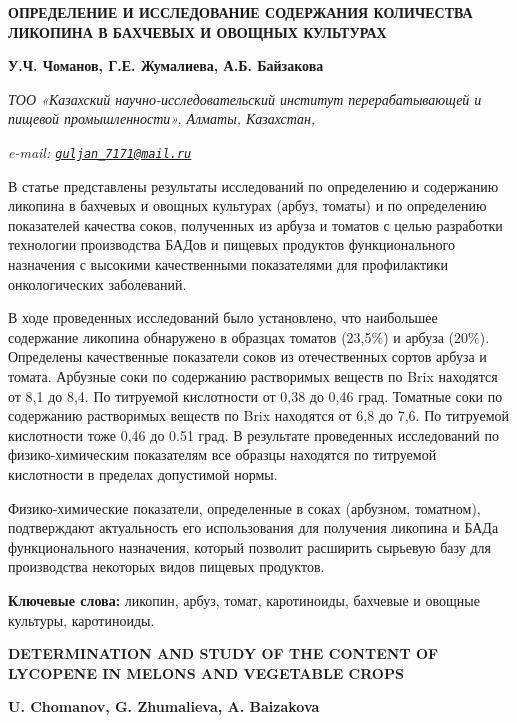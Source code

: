 \begin{articleheader}
{\bfseries ОПРЕДЕЛЕНИЕ И ИССЛЕДОВАНИЕ СОДЕРЖАНИЯ КОЛИЧЕСТВА ЛИКОПИНА В БАХЧЕВЫХ И ОВОЩНЫХ КУЛЬТУРАХ}

{\bfseries
У.Ч. Чоманов,
Г.Е. Жумалиева\textsuperscript{\envelope },
А.Б. Байзакова}
\end{articleheader}

\begin{affiliation}
\emph{ТОО «Казахский научно-исследовательский институт перерабатывающей и пищевой промышленности», Алматы, Казахстан,}

\emph{e-mail: \href{mailto:guljan_7171@mail.ru}{\nolinkurl{guljan\_7171@mail.ru}}}
\end{affiliation}

В статье представлены результаты исследований по определению и
содержанию ликопина в бахчевых и овощных культурах (арбуз, томаты) и по
определению показателей качества соков, полученных из арбуза и томатов с
целью разработки технологии производства БАДов и пищевых продуктов
функционального назначения с высокими качественными показателями для
профилактики онкологических заболеваний.

В ходе проведенных исследований было установлено, что наибольшее
содержание ликопина обнаружено в образцах томатов (23,5\%) и арбуза
(20\%). Определены качественные показатели соков из отечественных сортов
арбуза и томата. Арбузные соки по содержанию растворимых веществ по Brix
находятся от 8,1 до 8,4. По титруемой кислотности от 0,38 до 0,46 град.
Томатные соки по содержанию растворимых веществ по Brix находятся от 6,8
до 7,6. По титруемой кислотности тоже 0,46 до 0.51 град. В результате
проведенных исследований по физико-химическим показателям все образцы
находятся по титруемой кислотности в пределах допустимой нормы.

Физико-химические показатели, определенные в соках (арбузном, томатном),
подтверждают актуальность его использования для получения ликопина и
БАДа функционального назначения, который позволит расширить сырьевую
базу для производства некоторых видов пищевых продуктов.

{\bfseries Ключевые слова:} ликопин, арбуз, томат, каротиноиды, бахчевые и
овощные культуры, каротиноиды.

\begin{articleheader}
{\bfseries DETERMINATION AND STUDY OF THE CONTENT OF LYCOPENE IN MELONS AND VEGETABLE CROPS}

{\bfseries
U. Chomanov,
G. Zhumalieva\textsuperscript{\envelope },
A. Baizakova}
\end{articleheader}

